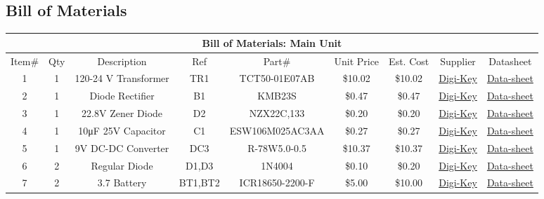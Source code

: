 \begin{landscape}
\section{Bill of Materials}
\begin{center}
  \begin{table}[h]
    \addtocounter{table}{-1}
  \begin{longtable}[c]{|c|c|c|c|c|c|c|c|c|}
    \hline
    \multicolumn{9}{|c|}{Bill of Materials: Main Unit}\\
    \hline
    Item\#&Qty&Description&Ref&Part\#&Unit Price&Est. Cost&Supplier&Datasheet\\
    \hline
    1&1&120-24 \si{\V} Transformer&TR1&TCT50-01E07AB&\$10.02&\$10.02&\href{https://www.digikey.com/en/products/detail/triad-magnetics/TCT50-01E07AB/2688350}{Digi-Key}&\href{http://catalog.triadmagnetics.com/Asset/TCT50-01E07AB.pdf}{Data-sheet}\\
    \hline
    2&1&Diode Rectifier&B1&KMB23S&\$0.47&\$0.47&\href{https://www.digikey.com/en/products/detail/smc-diode-solutions/KMB23S/7898339}{Digi-Key}&\href{https://www.smc-diodes.com/propdf/KMB22S\%20THRU\%20KMB220S\%20N1952\%20REV.B.pdf}{Data-sheet}\\
    \hline
    3&1&22.8\si{\V} Zener Diode&D2&NZX22C,133&\$0.20&\$0.20&\href{https://www.digikey.com/en/products/detail/nexperia-usa-inc/NZX22C-133/2296288}{Digi-Key}&\href{https://assets.nexperia.com/documents/data-sheet/NZX_SER.pdf}{Data-sheet}\\
    \hline
    4&1&10\si{\micro\farad} 25\si{\V} Capacitor&C1&ESW106M025AC3AA&\$0.27&\$0.27&\href{https://www.digikey.com/en/products/detail/kemet/ESW106M025AC3AA/13176208?s=N4IgTCBcDaIBwHYCCBhOBGArJkBdAvkA}{Digi-Key}&\href{https://api.kemet.com/component-edge/download/datasheet/ESW106M025AC3AA.pdf}{Data-sheet}\\
    \hline
    5&1&9\si{\V} DC-DC Converter&DC3&R-78W5.0-0.5&\$10.37&\$10.37&\href{https://www.digikey.com/en/products/detail/recom-power/R-78W9-0-0-5/4930587?s=N4IgTCBcDaIEoFoDsAOA6gTgHQAYE6wFYQBdAXyA}{Digi-Key}&\href{https://recom-power.com/pdf/Innoline/R-78W-0.5.pdf}{Data-sheet}\\
    \hline
    6&2&Regular Diode&D1,D3&1N4004&\$0.10&\$0.20&\href{https://www.digikey.com/en/products/detail/nte-electronics-inc/1N4004/11645015}{Digi-Key}&\href{https://www.digikey.com/en/products/detail/nte-electronics-inc/1N4004/11645015}{Data-sheet}\\
    \hline
    7&2&3.7 Battery&BT1,BT2&ICR18650-2200-F&\$5.00&\$10.00&\href{https://www.digikey.com/en/products/detail/pkcell/ICR18650-2200-F/11629982?s=N4IgTCBcDaIJIGEBKBGAHANgKwAYC0YYO\%2BAYiALoC\%2BQA}{Digi-Key}&\href{https://media.digikey.com/pdf/Data\%20Sheets/FusPower\%20PDF's/ICR18650_2200.pdf}{Data-sheet}\\

\end{longtable}
\end{table}
\end{center}
\end{landscape}
